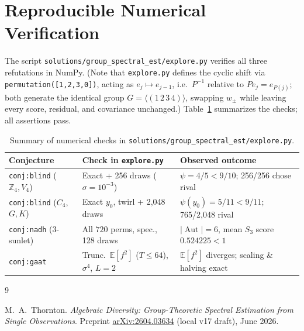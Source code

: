 \documentclass[11pt]{article}
\theoremstyle{plain}
\theoremstyle{definition}
\theoremstyle{remark}
\DeclareMathOperator{\Aut}{Aut}
\begin{document}
\section{Reproducible Numerical Verification}

The script \texttt{solutions/group\_spectral\_est/explore.py} verifies all three refutations in NumPy. (Note that \texttt{explore.py} defines the cyclic shift via \texttt{permutation([1,2,3,0])}, acting as $e_j \mapsto e_{j-1}$, i.e.\ $P^{-1}$ relative to $P e_j = e_{P(j)}$; both generate the identical group $G = \langle(1\,2\,3\,4)\rangle$, swapping $w_\pm$ while leaving every score, residual, and covariance unchanged.) Table~\ref{tab:gse} summarizes the checks; all assertions pass.

\begin{table}[htbp]
\centering
\small
\begin{tabular}{@{}lll@{}}
\toprule
Conjecture & Check in \texttt{explore.py} & Observed outcome \\
\midrule
\texttt{conj:blind} ($\mathbb{Z}_4, V_4$) & Exact + 256 draws ($\sigma = 10^{-3}$) & $\psi = 4/5 < 9/10$; 256/256 chose rival \\
\texttt{conj:blind} ($C_4$, $G, K$) & Exact $y_0$, twirl + 2{,}048 draws & $\psi(y_0) = 5/11 < 9/11$; 765/2{,}048 rival \\
\texttt{conj:nadh} ($3$-sunlet) & All $720$ perms, spec., 128 draws & $|\Aut|=6$, mean $S_3$ score $0.524225 < 1$ \\
\texttt{conj:gaat} & Trunc.\ $\mathbb{E}[f^2]$ ($T \le 64$), $\sigma^4$, $L=2$ & $\mathbb{E}[f^2]$ diverges; scaling \& halving exact \\
\bottomrule
\end{tabular}
\caption{Summary of numerical checks in \texttt{solutions/group\_spectral\_est/explore.py}.}\label{tab:gse}
\end{table}

\begin{thebibliography}{9}

M.~A.~Thornton.
\emph{Algebraic Diversity: Group-Theoretic Spectral Estimation from Single Observations}.
Preprint \href{https://arxiv.org/abs/2604.03634}{arXiv:2604.03634} (local v17 draft), June 2026.

\end{thebibliography}
\end{document}
